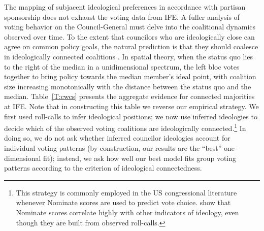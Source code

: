 \documentclass[12 pt, letter]{article}
\begin{document}
The mapping of subjacent ideological preferences in accordance with partisan sponsorship does not exhaust the voting data from IFE.  %
A fuller analysis of voting behavior on the Council-General must
delve into the coalitional dynamics observed over time.  To the
extent that councilors who are ideologically close can agree on
common policy goals, the natural prediction is that they should
coalesce in ideologically connected coalitions \citep{Axelrod1970}.
In spatial theory, when the status quo lies to the right of the
median in a unidimensional spectrum, the left bloc votes together to
bring policy towards the median member's ideal point, with coalition
size increasing monotonically with the distance between the status
quo and the median.  Table~\ref{T:cwcs} presents the aggregate
evidence for connected majorities at IFE.  Note that in constructing
this table we reverse our empirical strategy.  We first used
roll-calls to infer ideological positions; we now use inferred
ideologies to decide which of the observed voting coalitions are
ideologically connected.\footnote{This strategy is commonly employed
in the US congressional literature whenever {\sc Nominate} scores
are used to predict vote choice.  \citet{Burden2000} show that {\sc
Nominate} scores correlate highly with other indicators of ideology,
even though they are built from observed roll-calls.}  In doing so,
we do not ask whether inferred councilor ideologies account for
individual voting patterns (by construction, our results are the
``best'' one-dimensional fit); instead, we ask how well our best
model fits group voting patterns according to the criterion of
ideological connectedness.
\end{document}
